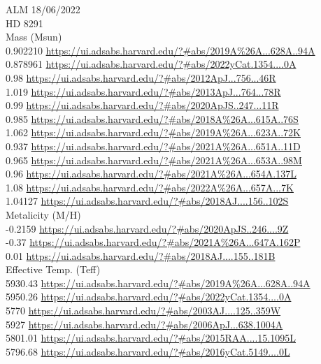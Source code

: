 ALM 18/06/2022\\
HD 8291\\
Mass (Msun)\\
0.902210 \url{https://ui.adsabs.harvard.edu/?#abs/2019A%26A...628A..94A}\\
0.878961 \url{https://ui.adsabs.harvard.edu/?#abs/2022yCat.1354....0A}\\
0.98 \url{https://ui.adsabs.harvard.edu/?#abs/2012ApJ...756...46R}\\
1.019 \url{https://ui.adsabs.harvard.edu/?#abs/2013ApJ...764...78R}\\
0.99 \url{https://ui.adsabs.harvard.edu/?#abs/2020ApJS..247...11R}\\
0.985 \url{https://ui.adsabs.harvard.edu/?#abs/2018A%26A...615A..76S}\\
1.062 \url{https://ui.adsabs.harvard.edu/?#abs/2019A%26A...623A..72K}\\
0.937 \url{https://ui.adsabs.harvard.edu/?#abs/2021A%26A...651A..11D}\\
0.965 \url{https://ui.adsabs.harvard.edu/?#abs/2021A%26A...653A..98M}\\
0.96 \url{https://ui.adsabs.harvard.edu/?#abs/2021A%26A...654A.137L}\\
1.08 \url{https://ui.adsabs.harvard.edu/?#abs/2022A%26A...657A...7K}\\
1.04127 \url{https://ui.adsabs.harvard.edu/?#abs/2018AJ....156..102S}\\
Metalicity (M/H)\\
-0.2159 \url{https://ui.adsabs.harvard.edu/?#abs/2020ApJS..246....9Z}\\
-0.37 \url{https://ui.adsabs.harvard.edu/?#abs/2021A%26A...647A.162P}\\
0.01 \url{https://ui.adsabs.harvard.edu/?#abs/2018AJ....155..181B}\\
Effective Temp. (Teff)\\
5930.43	\url{https://ui.adsabs.harvard.edu/?#abs/2019A%26A...628A..94A}\\
5950.26	\url{https://ui.adsabs.harvard.edu/?#abs/2022yCat.1354....0A}\\
5770 \url{https://ui.adsabs.harvard.edu/?#abs/2003AJ....125..359W}\\
5927 \url{https://ui.adsabs.harvard.edu/?#abs/2006ApJ...638.1004A}\\
5801.01 \url{https://ui.adsabs.harvard.edu/?#abs/2015RAA....15.1095L}\\
5796.68 \url{https://ui.adsabs.harvard.edu/?#abs/2016yCat.5149....0L}\\
